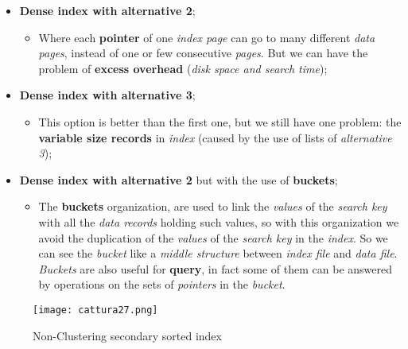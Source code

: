 \documentclass{article}
\begin{document}
\begin{itemize}
\item \textbf{Dense index with alternative 2};
\begin{itemize}
\item Where each \textbf{pointer} of one \emph{index page} can go to many different \emph{data pages}, instead of one or few consecutive \emph{pages}. But we can have the problem of \textbf{excess overhead} (\emph{disk space and search time});
\end{itemize}
\item \textbf{Dense index with alternative 3};
\begin{itemize}
\item This option is better than the first one, but we still have one problem: the \textbf{variable size records} in \emph{index} (caused by the use of lists of \emph{alternative 3});
\end{itemize}
\item \textbf{Dense index with alternative 2} but with the use of \textbf{buckets};
\begin{itemize}
\item The \textbf{buckets} organization, are used to link the \emph{values} of the \emph{search key} with all the \emph{data records} holding such values, so with this organization we avoid the duplication of the \emph{values} of the \emph{search key} in the \emph{index}. So we can see the \emph{bucket} like a \emph{middle structure} between \emph{index file} and \emph{data file}. \emph{Buckets} are also useful for \textbf{query}, in fact some of them can be answered by operations on the sets of \emph{pointers} in the \emph{bucket}. 
\end{itemize}
\end{itemize}
\begin{figure}[H]
  \centering
  \texttt{[image: cattura27.png]}
  \caption{Non-Clustering secondary sorted index}
\end{figure}
\end{document}
